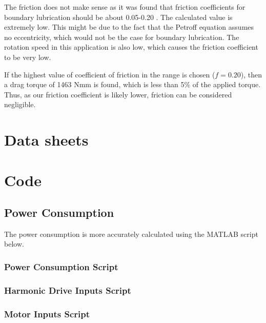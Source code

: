The friction does not make sense as it was found that friction coefficients for boundary lubrication should be about 0.05-0.20 \cite{juvinall_fundamentals_2012}. The calculated value is extremely low. This might be due to the fact that the Petroff equation assumes no eccentricity, which would not be the case for boundary lubrication. The rotation speed in this application is also low, which causes the friction coefficient to be very low. 

If the highest value of coefficient of friction in the range is chosen ($f=0.20$), then a drag torque of 1463 Nmm is found, which is less than 5\% of the applied torque. Thus, as our friction coefficient is likely lower, friction can be considered negligible. 

\section{Data sheets} \label{app:datasheets}








\section{Code} \label{app:code}

\subsection{Power Consumption} \label{app:code_power_consumption}

The power consumption is more accurately calculated using the MATLAB script below.

\subsubsection{Power Consumption Script}



\subsubsection{Harmonic Drive Inputs Script}



\subsubsection{Motor Inputs Script}

